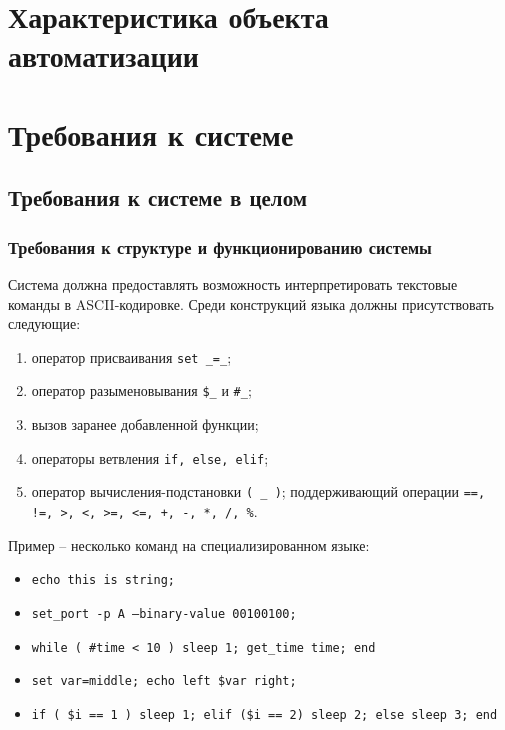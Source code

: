 \documentclass[a4paper, 12pt]{report}
\begin{document}
\section{Характеристика объекта автоматизации}

\section{Требования к системе}


\subsection{Требования к системе в целом}

\subsubsection{Требования к структуре и функционированию системы}

Система должна предоставлять возможность интерпретировать текстовые команды в ASCII-кодировке.
Среди конструкций языка должны присутствовать следующие:
\begin{enumerate}
	\item оператор присваивания {\tt set \_=\_};
	\item оператор разыменовывания {\tt \$\_} и {\tt \#\_};
	\item вызов заранее добавленной функции;
	\item операторы ветвления {\tt if, else, elif};
	\item оператор вычисления-подстановки {\tt ( \_ )};
		поддерживающий операции {\tt ==, !=, >, <, >=, <=, +, -, *, /, \%}.
\end{enumerate}

Пример -- несколько команд на специализированном языке:
\begin{itemize}
	\item {\tt echo this is string;}
	\item {\tt set\_port -p A --binary-value 00100100;}
	\item {\tt while ( \#time < 10 ) sleep 1; get\_time time; end}
	\item {\tt set var=middle; echo left \$var right;}
	\item {\tt if ( \$i == 1 ) sleep 1; elif (\$i == 2) sleep 2; else sleep 3; end}
\end{itemize}
\end{document}
